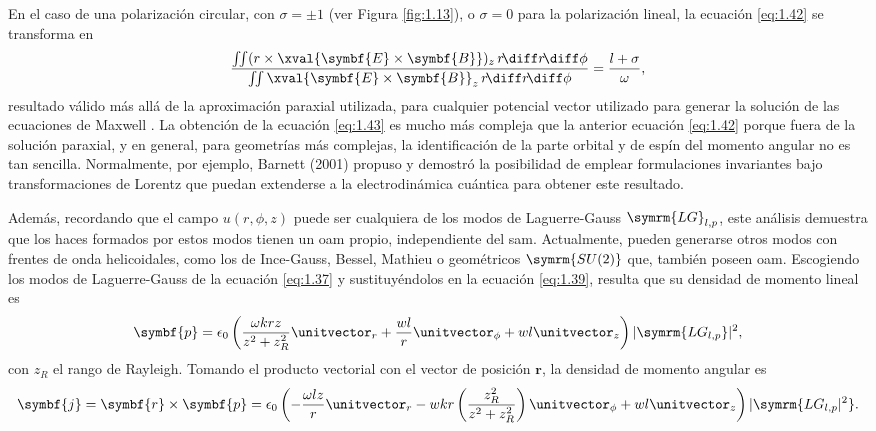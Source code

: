 En el caso de una polarización circular, con $\sigma = \pm 1$ (ver Figura \ref{fig:1.13}), o $\sigma = 0$ para la polarización lineal, la ecuación \eqref{eq:1.42} se transforma en
\begin{equation}\label{eq:1.43}
  \frac{\iint(r \times \xval{\symbf{E}\times \symbf{B}})_{z}\, r\!\diff r\!\diff \phi}{\iint \xval{\symbf{E}\times \symbf{B}}_{z}\, r\!\diff r\!\diff \phi} = \frac{l + \sigma}{\omega},
\end{equation}
resultado válido más allá de la aproximación paraxial utilizada, para cualquier potencial vector utilizado para generar la solución de las ecuaciones de Maxwell \autocite{Barnett1994}. La obtención de la ecuación \eqref{eq:1.43} es mucho más compleja que la anterior ecuación \eqref{eq:1.42} porque \autocite{Barnett2001} fuera de la solución paraxial, y en general, para geometrías más complejas, la identificación de la parte orbital y de espín del momento angular no es tan sencilla. Normalmente, por ejemplo, Barnett (2001) \autocite{Barnett2001} propuso y demostró la posibilidad de emplear formulaciones invariantes bajo transformaciones de Lorentz que puedan extenderse a la electrodinámica cuántica para obtener este resultado.

Además, recordando que el campo $u(r,\phi,z)$ puede ser cualquiera de los modos de Laguerre-Gauss $\symrm{LG}_{l,p}$, este análisis demuestra que los haces formados por estos modos tienen un \acrshort{oam} propio, independiente del \acrshort{sam}. Actualmente, pueden generarse otros modos con frentes de onda helicoidales, como los de Ince-Gauss, Bessel, Mathieu o geométricos $\symrm{SU(2)}$ que, también poseen \acrshort{oam}. Escogiendo los modos de Laguerre-Gauss de la ecuación \eqref{eq:1.37} y sustituyéndolos en la ecuación \eqref{eq:1.39}, resulta que su densidad de momento lineal es
\begin{equation}\label{eq:1.44}
  \symbf{p} = \epsilon_{0} \left(\frac{\omega k r z}{z^{2}+z_{R}^{2}}\unitvector_{r}+\frac{wl}{r}\unitvector_{\phi}+wl \unitvector_{z}\right)|\symrm{LG_{l,p}}|^{2},
\end{equation}
con $z_{R}$ el rango de Rayleigh. Tomando el producto vectorial con el vector de posición $\symbf{r}$, la densidad de momento angular es
\begin{equation}\label{eq:1.45}
  \symbf{j} = \symbf{r} \times \symbf{p} = \epsilon_{0} \left(-\frac{\omega l z}{r}\unitvector_{r}-wkr \left(\frac{z_{R}^{2}}{z^{2}+z_{R}^{2}}\right)\unitvector_{\phi}+wl \unitvector_{z}\right)|\symrm{LG_{l,p}|^{2}}.
\end{equation}


